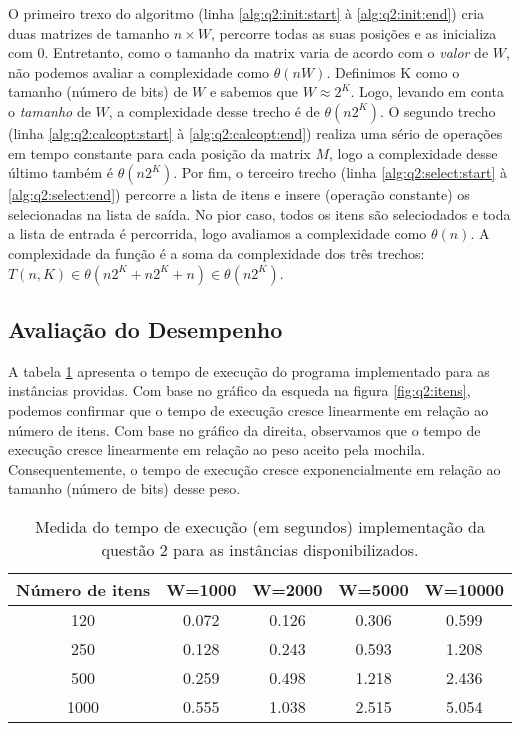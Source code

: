 \documentclass[a4paper]{article}
\newcommand{\algsection}[2]{(linha \ref{alg:#1:#2:start} à \ref{alg:#1:#2:end})}
\begin{document}
O primeiro trexo do algoritmo \algsection{q2}{init} cria duas matrizes de tamanho $n \times W$, percorre todas as suas posições e as inicializa com 0. Entretanto, como o tamanho da matrix varia de acordo com o \emph{valor} de $W$, não podemos avaliar a complexidade como $\theta(nW)$. Definimos K como o tamanho (número de bits) de $W$ e sabemos que $W \approx 2^K$. Logo, levando em conta o \emph{tamanho} de $W$, a complexidade desse trecho é de $\theta(n2^K)$. O segundo trecho \algsection{q2}{calcopt} realiza uma sério de operações em tempo constante para cada posição da matrix $M$, logo a complexidade desse último também é $\theta(n2^K)$. Por fim, o terceiro trecho \algsection{q2}{select} percorre a lista de itens e insere (operação constante) os selecionadas na lista de saída. No pior caso, todos os itens são seleciodados e toda a lista de entrada é percorrida, logo avaliamos a complexidade como $\theta(n)$. A complexidade da função é a soma da complexidade dos três trechos: $T(n, K) \in \theta(n2^K + n2^K + n) \in \theta(n2^K)$.

\subsection{Avaliação do Desempenho}

A tabela \ref{tab:q2:bench} apresenta o tempo de execução do programa implementado para as instâncias providas.
Com base no gráfico da esqueda na figura \ref{fig:q2:itens}, podemos confirmar que o tempo de execução cresce linearmente em relação ao número de itens. Com base no gráfico da direita, observamos que o tempo de execução cresce linearmente em relação ao peso aceito pela mochila. Consequentemente, o tempo de execução cresce exponencialmente em relação ao tamanho (número de bits) desse peso.

\begin{table}[H]
\centering
\begin{tabular}{c|c|c|c|c}
Número de itens & W=1000 & W=2000 & W=5000 & W=10000 \\
\hline
120 & 0.072 & 0.126 & 0.306 & 0.599 \\
250 & 0.128 & 0.243 & 0.593 & 1.208 \\
500 & 0.259 & 0.498 & 1.218 & 2.436 \\
1000 & 0.555 & 1.038 & 2.515 & 5.054 \\
\end{tabular}
\caption{Medida do tempo de execução (em segundos) implementação da questão 2 para as instâncias disponibilizados.}
\label{tab:q2:bench}
\end{table}
\end{document}
